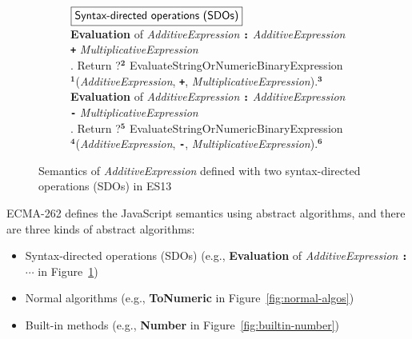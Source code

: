 \documentclass[acmsmall,review,screen]{acmart}
\newcommand{\esnt}[1]{\textit{\color{esnt}#1}}
\newcommand{\est}[1]{\textbf{\texttt{#1}}}
\newcommand{\esalg}[1]{{\color{esalg}#1}}
\newcommand{\escode}[1]{\textbf{\texttt{#1}}}
\newcommand{\lab}[1]{{}^{\textbf{#1}}}
\begin{document}
\begin{figure}
  \centering
  \begin{subfigure}{\textwidth}
    \small
    $\fbox{\textsf{Syntax-directed operations (SDOs)}}$
    \vspace*{0.5em}\\
    \textbf{Evaluation} of
    \esnt{AdditiveExpression} \est{:} \esnt{AdditiveExpression} \est{+}
    \esnt{MultiplicativeExpression}
    \\
    \null{}. Return ?$\lab{2}$
    \esalg{EvaluateStringOrNumericBinaryExpression}$\lab{1}$(\esnt{AdditiveExpression},
    \escode{+}, \esnt{MultiplicativeExpression}).$\lab{3}$
    \vspace*{0.5em}\\
    \textbf{Evaluation} of
    \esnt{AdditiveExpression} \est{:} \esnt{AdditiveExpression} \est{-}
    \esnt{MultiplicativeExpression}
    \\
    \null{}. Return ?$\lab{5}$
    \esalg{EvaluateStringOrNumericBinaryExpression}$\lab{4}$(\esnt{AdditiveExpression},
    \escode{-}, \esnt{MultiplicativeExpression}).$\lab{6}$

  \end{subfigure}
\vspace*{-1.5em}
  \caption{
    Semantics of \esnt{AdditiveExpression} defined with two syntax-directed
    operations (SDOs) in ES13
  }
  \label{fig:add-sdo}
\end{figure}

ECMA-262 defines the JavaScript semantics using abstract algorithms, and
there are three kinds of abstract algorithms:
%
\begin{itemize}
  \item Syntax-directed operations (SDOs) (e.g., \textbf{Evaluation} of
    \esnt{AdditiveExpression} \est{:} $\cdots$ in Figure~\ref{fig:add-sdo})

  \item Normal algorithms (e.g., \textbf{ToNumeric} in
    Figure~\ref{fig:normal-algos})

  \item Built-in methods (e.g., \textbf{Number} in
    Figure~\ref{fig:builtin-number})
\end{itemize}

\end{document}

